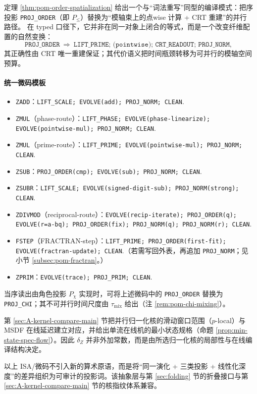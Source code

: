 \begin{remark}[序投影的空间化作为编译重写模式]\label{rem:pom-rewriting-order-spatialize}
定理 \ref{thm:pom-order-spatialization} 给出一个与“词法重写”同型的编译模式：把序投影 \texttt{PROJ\_ORDER}（即 \(P_{\le}\)）替换为“模轴束上的点wise 计算 + CRT 重建”的并行路径。
在 typed 口径下，它并非在同一对象上闭合的等式，而是一个改变纤维配置的自然变换：
\[
\texttt{PROJ\_ORDER}
\ \Longrightarrow\
\texttt{LIFT\_PRIME; (pointwise);\ CRT\_READOUT; PROJ\_NORM},
\]
其正确性由 CRT 唯一重建保证；其代价语义把时间瓶颈转移为可并行的模轴空间预算。
\end{remark}

\paragraph{统一微码模板}
\begin{itemize}
  \item \texttt{ZADD}：\texttt{LIFT\_SCALE; EVOLVE(add); PROJ\_NORM; CLEAN}.
  \item \texttt{ZMUL}（phase-route）：\texttt{LIFT\_PHASE; EVOLVE(phase-linearize); EVOLVE(pointwise-mul); PROJ\_NORM; CLEAN}.
  \item \texttt{ZMUL}（prime-route）：\texttt{LIFT\_PRIME; EVOLVE(pointwise-mul); PROJ\_NORM; CLEAN}.
  \item \texttt{ZSUB}：\texttt{PROJ\_ORDER(cmp); EVOLVE(sub); PROJ\_NORM; CLEAN}.
  \item \texttt{ZSUBR}：\texttt{LIFT\_SCALE; EVOLVE(signed-digit-sub); PROJ\_NORM(strong); CLEAN}.
  \item \texttt{ZDIVMOD}（reciprocal-route）：\texttt{EVOLVE(recip-iterate); PROJ\_ORDER(q); EVOLVE(r=a-bq); PROJ\_ORDER(fix); PROJ\_NORM(q); PROJ\_NORM(r); CLEAN}.
  \item \texttt{FSTEP}（FRACTRAN-step）：\texttt{LIFT\_PRIME; PROJ\_ORDER(first-fit); EVOLVE(fractran-update); CLEAN}.（若需写回外表，再追加 \texttt{PROJ\_NORM}；见小节 \ref{subsec:pom-fractran}。）
  \item \texttt{ZPRIM}：\texttt{EVOLVE(trace); PROJ\_PRIM; CLEAN}.
\end{itemize}

\begin{remark}
当序读出由角色投影 $P_\chi$ 实现时，可将上述微码中的 \texttt{PROJ\_ORDER} 替换为 \texttt{PROJ\_CHI}；其不可并行时间尺度由 $\tau_{\mathrm{mix}}$ 给出（注 \ref{rem:pom-chi-mixing}）。
\end{remark}

\begin{remark}\label{rem:pom-plocal-delay}
第 \ref{sec:A-kernel-compare-main} 节把并行归一化核的滑动窗口范围（$p$-local）与 MSDF 在线延迟建立对应，并给出单流在线机的最小状态规格（命题 \ref{prop:min-state-spec-flow}）。因此 $\delta_Z$ 并非外加常数，而是由所选归一化核的局部性与在线编译结构决定。
\end{remark}

以上 ISA/微码不引入新的算术原语，而是将“同一演化 + 三类投影 + 线性化深度”的差异组织为可审计的投影词。该抽象层与第 \ref{sec:folding} 节的折叠接口与第 \ref{sec:A-kernel-compare-main} 节的核指纹体系兼容。
